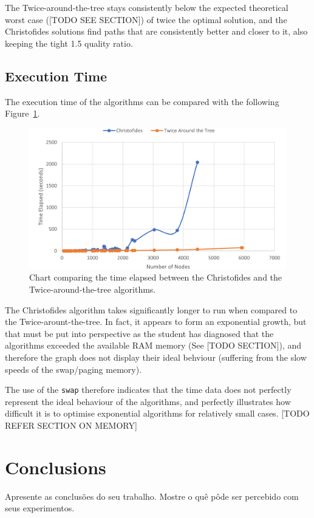 \documentclass[12pt]{article}
\begin{document}
The Twice-around-the-tree stays consistently below the expected theoretical worst case ([TODO SEE SECTION]) of 
twice the optimal solution, and the Christofides solutions find paths that are consistently better and closer to it, 
also keeping the tight 1.5 quality ratio.

\subsection{Execution Time}

The execution time of the algorithms can be compared with the following Figure~\ref{fig:exec_time}.

\begin{figure}[ht]
\centering
\includegraphics[height=.325\textheight]{execution_time_comparison.png}
\caption{Chart comparing the time elapsed between the Christofides and the Twice-around-the-tree algorithms.}
\label{fig:exec_time}
\end{figure}

The Christofides algorithm takes significantly longer to run when compared to the Twice-arount-the-tree. 
In fact, it appears to form an exponential growth, but that must be put into perspective as the student 
has diagnosed that the algorithms exceeded the available RAM memory (See [TODO SECTION]), and therefore 
the graph does not display their ideal behviour (suffering from the slow speeds of the swap/paging memory).

The use of the \texttt{swap} therefore indicates that the time data does not perfectly represent the ideal behaviour 
of the algorithms, and perfectly illustrates how difficult it is to optimise exponential algorithms for relatively 
small cases. [TODO REFER SECTION ON MEMORY]

\section{Conclusions}
    Apresente as conclusões do seu trabalho. Mostre o quê pôde ser percebido
    com seus experimentos.



\end{document}
